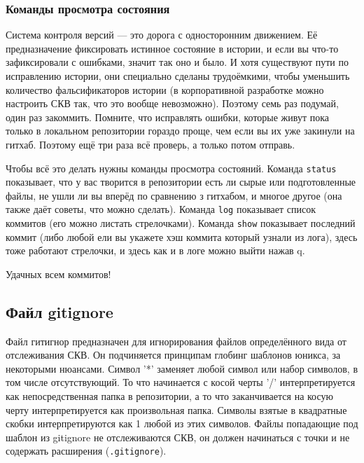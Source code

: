 \documentclass[12pt]{article}
\begin{document}
\subsubsection{Команды просмотра состояния}
Система контроля версий --- это дорога с односторонним движением. Её предназначение фиксировать истинное состояние в истории, и если вы что-то зафиксировали с ошибками, значит так оно и было. И хотя существуют пути по исправлению истории, они специально сделаны трудоёмкими, чтобы уменьшить количество фальсификаторов истории (в корпоративной разработке можно настроить СКВ так, что это вообще невозможно). Поэтому семь раз подумай, один раз закоммить. Помните, что исправлять ошибки, которые живут пока только в локальном репозитории гораздо проще, чем если вы их уже закинули на гитхаб. Поэтому ещё три раза всё проверь, а только потом отправь.

\begin{center}
\large{}
\end{center}

\begin{center}
\large{}
\end{center}

\begin{center}
\large{}
\end{center}

Чтобы всё это делать нужны команды просмотра состояний. Команда \verb|status| показывает, что у вас творится в репозитории есть ли сырые или подготовленные файлы, не ушли ли вы вперёд по сравнению з гитхабом, и многое другое (она также даёт советы, что можно сделать). Команда \verb|log| показывает список коммитов (его можно листать стрелочками). Команда \verb|show| показывает последний коммит (либо любой ели вы укажете хэш коммита который узнали из лога), здесь тоже работают стрелочки, и здесь как и в логе можно выйти нажав q.

\begin{center}
Удачных всем коммитов!
\end{center}

\subsection{Файл gitignore}

Файл гитигнор предназначен для игнорирования файлов определённого вида от отслеживания СКВ. Он подчиняется принципам глобинг шаблонов юникса, за некоторыми нюансами. Символ '*' заменяет любой символ или набор символов, в том числе отсутствующий. То что начинается с косой черты '/' интерпретируется как непосредственная папка в репозитории, а то что заканчивается на косую черту интерпретируется  как произвольная папка. Символы взятые в квадратные скобки интерпретируются как 1 любой из этих символов. Файлы попадающие под шаблон из gitignore не отслеживаются СКВ, он должен начинаться с точки и не содержать расширения (\verb|.gitignore|).
\end{document}

